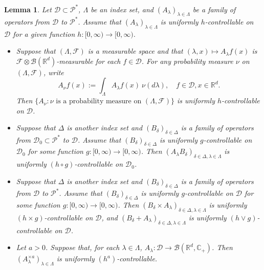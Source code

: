 \documentclass[12pt,a4paper]{amsart}
\theoremstyle{plain}
\newtheorem{lem}[thm]{Lemma}
\theoremstyle{definition}
\numberwithin{equation}{section}
\begin{document}
\begin{lem}
    \label{lem: property of controllable operators}
    Let $\mathcal D \subset \mathcal P^*$, $\Lambda$ be an index set, and $(A_\lambda)_{\lambda\in \Lambda}$ be a family of operators from $\mathcal D$ to $ \mathcal P^*$. Assume that $(A_\lambda)_{\lambda\in \Lambda}$ is uniformly $h$-controllable on $\mathcal D$ for a given function $h:[0,\infty) \to [0, \infty)$.
\begin{itemize}
\item[(1)]
    Suppose that $(\Lambda, \mathscr F)$ is a measurable space
    and that $(\lambda,x)\mapsto A_\lambda f(x)$ is $\mathscr F \otimes \mathscr B(\mathbb R^d)$-measurable for each $f\in \mathcal D$.
    For any probability measure $\nu$ on $(\Lambda, \mathscr F)$, write
\[
    A_\nu f(x):= \int_{\Lambda} A_\lambda f (x)~\nu(d\lambda), \quad f\in \mathcal D, x\in \mathbb R^d.
\]
    Then  $\{A_\nu: \nu \text{ is  a probability measure on } (\Lambda, \mathscr F)\}$ is uniformly $h$-controllable on $\mathcal D$.
\item[(2)]
    Suppose that $\Delta$ is another index set and $(B_\delta)_{\delta\in \Delta}$ is a family of operators from $\mathcal D_0\subset \mathcal P^*$ to $ \mathcal D$.
    Assume that $(B_\delta)_{\delta\in \Delta}$ is uniformly $g$-controllable on $\mathcal D_0$ for some function $g: [0,\infty) \to [0,\infty)$.
    Then  $(A_\lambda B_\delta)_{\delta\in \Delta, \lambda \in \Lambda}$ is uniformly $(h \circ g)$-controllable on $\mathcal D_0$.
\item[(3)]
    Suppose that $\Delta$ is another index set and $(B_\delta)_{\delta\in \Delta}$ is a family of operators from $\mathcal D$ to $ \mathcal P^*$.
    Assume that $(B_\delta)_{\delta\in \Delta}$ is uniformly $g$-controllable on $\mathcal D$ for some function $g: [0,\infty) \to [0,\infty)$.
    Then  $(B_\delta\times A_\lambda)_{\delta \in \Delta, \lambda \in \Lambda}$ is uniformly $(h\times g)$-controllable on $\mathcal D$, and $(B_\delta + A_\lambda)_{\delta \in \Delta, \lambda \in \Lambda}$ is uniformly $(h\vee g)$-controllable on $\mathcal D$.
\item[(4)]
    Let $a>0$. Suppose that, for each $\lambda \in \Lambda$, $A_\lambda : \mathcal D \to \mathcal B(\mathbb R^d, \mathbb C_+)$.
    Then $(A^{\times a}_\lambda)_{\lambda \in \Lambda}$ is uniformly $(h^a)$-controllable.
\end{itemize}
\end{lem}
\end{document}
